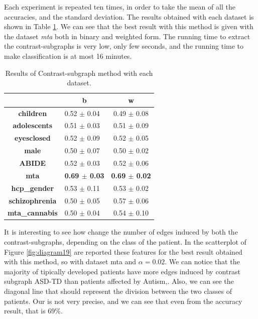 Each experiment is repeated ten times, in order to take the mean of all the accuracies, and the standard deviation. The results obtained with each dataset is shown in Table \ref{tab:c-s}. We can see that the best result with this method is given with the dataset \textit{mta} both in binary and weighted form. The running time to extract the contrast-subgraphs is very low, only few seconds, and the running time to make classification is at most 16 minutes.
\vspace{0.5cm}
\begin{table}
	\centering
	\begin{tabular}{c|l|c} 
		\toprule
		& \multicolumn{1}{c|}{b} & w                \\ 
		\midrule
		\textbf{children}      & 0.52 $\pm$ 0.04        & 0.49 $\pm$ 0.08  \\
		\textbf{adolescents}   & 0.51 $\pm$ 0.03        & 0.51 $\pm$ 0.09  \\
		\textbf{eyesclosed}    & 0.52 $\pm$ 0.09        & 0.52 $\pm$ 0.05  \\
		\textbf{male}          & 0.50 $\pm$ 0.07        & 0.50 $\pm$ 0.02  \\
		\textbf{ABIDE}         & 0.52 $\pm$ 0.03        & 0.52 $\pm$ 0.06  \\
		\textbf{mta}           & \textbf{0.69 $\pm$ 0.03}        & \textbf{0.69 $\pm$ 0.02}  \\
		\textbf{hcp\_gender}   & 0.53 $\pm$ 0.11        & 0.53 $\pm$ 0.02  \\
		\textbf{schizophrenia} & 0.50 $\pm$ 0.05        & 0.57 $\pm$ 0.06  \\
		\textbf{mta\_cannabis} & 0.50 $\pm$ 0.04        & 0.54 $\pm$ 0.10 
	\end{tabular}
	\caption{Results of Contrast-subgraph method with each dataset.}
	\label{tab:c-s}
\end{table}

It is interesting to see how change the number of edges induced by both the contrast-subgraphs, depending on the class of the patient. In the scatterplot of Figure \ref{fig:diagram19} are reported these features for the best result obtained with this method, so with dataset mta and $ \alpha = 0.02 $. We can notice that the majority of tipically developed patients have more edges induced by contrast subgraph ASD-TD than patients affected by Autism,. Also, we can see the diagonal line that should represent the division between the two classes of patients. Our is not very precise, and we can see that even from the accuracy result, that is 69\%.

